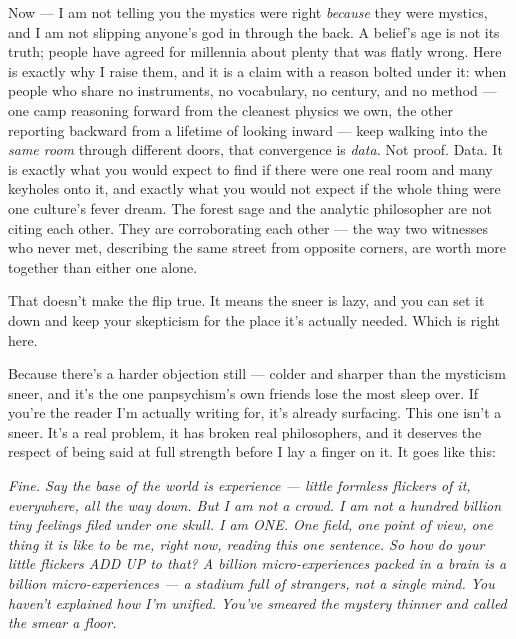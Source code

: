\documentclass[11pt,openany]{book}
\begin{document}
Now — I am not telling you the mystics were right \textit{because} they were mystics, and I am not slipping anyone’s god in through the back. A belief’s age is not its truth; people have agreed for millennia about plenty that was flatly wrong. Here is exactly why I raise them, and it is a claim with a reason bolted under it: when people who share no instruments, no vocabulary, no century, and no method — one camp reasoning forward from the cleanest physics we own, the other reporting backward from a lifetime of looking inward — keep walking into the \textit{same room} through different doors, that convergence is \textit{data.} Not proof. Data. It is exactly what you would expect to find if there were one real room and many keyholes onto it, and exactly what you would not expect if the whole thing were one culture’s fever dream. The forest sage and the analytic philosopher are not citing each other. They are corroborating each other — the way two witnesses who never met, describing the same street from opposite corners, are worth more together than either one alone.

That doesn’t make the flip true. It means the sneer is lazy, and you can set it down and keep your skepticism for the place it’s actually needed. Which is right here.

Because there’s a harder objection still — colder and sharper than the mysticism sneer, and it’s the one panpsychism’s own friends lose the most sleep over. If you’re the reader I’m actually writing for, it’s already surfacing. This one isn’t a sneer. It’s a real problem, it has broken real philosophers, and it deserves the respect of being said at full strength before I lay a finger on it. It goes like this:

\textit{Fine. Say the base of the world is experience — little formless flickers of it, everywhere, all the way down. But I am not a crowd. I am not a hundred billion tiny feelings filed under one skull. I am ONE. One field, one point of view, one thing it is like to be me, right now, reading this one sentence. So how do your little flickers ADD UP to that? A billion micro-experiences packed in a brain is a billion micro-experiences — a stadium full of strangers, not a single mind. You haven’t explained how I’m unified. You’ve smeared the mystery thinner and called the smear a floor.}
\end{document}
